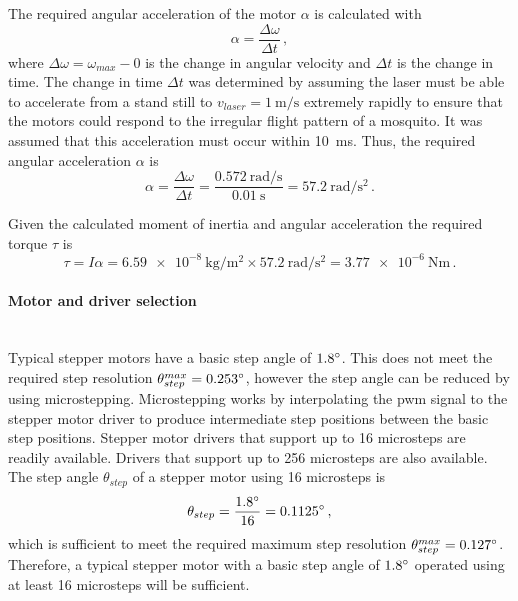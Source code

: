 The required angular acceleration of the motor $\alpha$ is calculated with
\begin{equation}
  \alpha = \frac{\Delta\omega}{\Delta t}\,,
\end{equation}
where $\Delta\omega = \omega_{max} - 0$ is the change in angular velocity and $\Delta t$ is the change in time. The change in time $\Delta t$ was determined by assuming the laser must be able to accelerate from a stand still to $v_{laser} = \SI{1}{\meter\per\second}$ extremely rapidly to ensure that the motors could respond to the irregular flight pattern of a mosquito. It was assumed that this acceleration must occur within 10~ms. Thus, the required angular acceleration $\alpha$ is
\begin{equation}
  \alpha = \frac{\Delta\omega}{\Delta t} = \frac{\SI{0.572}{\radian\per\second}}{\SI{0.01}{\second}} = \SI{57.2}{\radian\per\second\squared}\,.
\end{equation}

Given the calculated moment of inertia and angular acceleration the required torque $\tau$ is
\begin{equation}
  \tau = I\alpha = \SI{6.59e-8}{\kg\per\meter\squared} \times \SI{57.2}{\radian\per\second\squared} = \SI{3.77e-6}{\newton\meter}\,.
\end{equation}


\paragraph{Motor and driver selection}\hfill\\
Typical stepper motors have a basic step angle of $1.8^{\circ}$. This does not meet the required step resolution $\theta_{step}^{max} = 0.253^{\circ}$, however the step angle can be reduced by using microstepping. Microstepping works by interpolating the \gls{pwm} signal to the stepper motor driver to produce intermediate step positions between the basic step positions. Stepper motor drivers that support up to 16 microsteps are readily available. Drivers that support up to 256 microsteps are also available. The step angle $\theta_{step}$ of a stepper motor using 16 microsteps is
\begin{equation}
  \theta_{step} = \frac{1.8^{\circ}}{16} = 0.1125^{\circ}\,,
\end{equation}
which is sufficient to meet the required maximum step resolution $\theta_{step}^{max} = 0.127^{\circ}$. Therefore, a typical stepper motor with a basic step angle of $1.8^{\circ}$ operated using at least 16 microsteps will be sufficient.

